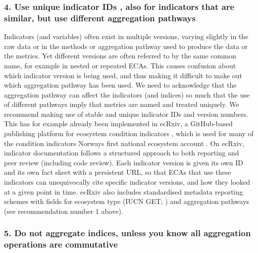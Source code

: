 \documentclass[
  authoryear,
  preprint,
  3p]{elsarticle}
\begin{document}
\subsubsection*{4. Use unique indicator IDs , also for indicators that
are similar, but use different aggregation
pathways}\label{use-unique-indicator-ids-also-for-indicators-that-are-similar-but-use-different-aggregation-pathways}

Indicators (and variables) often exist in multiple versions, varying
slightly in the raw data or in the methods or aggregation pathway used
to produce the data or the metrics. Yet different versions are often
referred to by the same common name, for example in nested or repeated
ECAs. This causes confusion about which indicator version is being used,
and thus making it difficult to make out which aggregation pathway has
been used. We need to acknowledge that the aggregation pathway can
affect the indicators (and indices) so much that the use of different
pathways imply that metrics are named and treated uniquely. We recommend
making use of stable and unique indicator IDs and version numbers. This
has for example already been implemented in ecRxiv, a GitHub-based
publishing platform for ecosystem condition indicators
\citep{Kolstad_ecRxiv}, which is used for many of the condition
indicators Norways first national ecosystem account
\citep{fjell2026, skog2026}. On ecRxiv, indicator documentation follows
a structured approach to both reporting and peer review (including code
review). Each indicator version is given its own ID and its own fact
sheet with a persistent URL, so that ECAs that use these indicators can
unequivocally cite specific indicator versions, and how they looked at a
given point in time. ecRxiv also includes standardised metadata
reporting schemes with fields for ecosystem type (IUCN GET;
\citet{keith_iucn_2020}) and aggregation pathways (see recommendation
number 1 above).

\subsubsection*{5. Do not aggregate indices, unless you know all
aggregation operations are
commutative}\label{do-not-aggregate-indices-unless-you-know-all-aggregation-operations-are-commutative}
\end{document}
